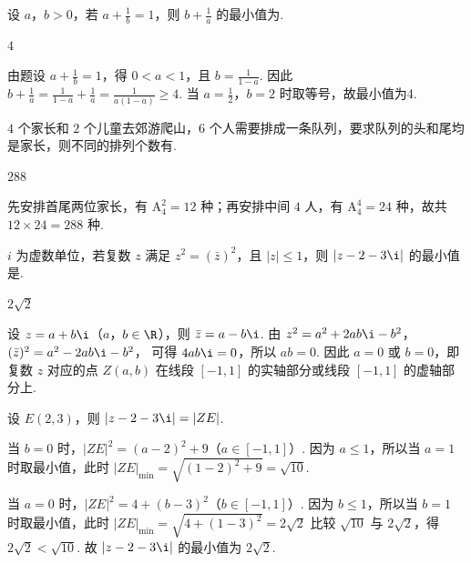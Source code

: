 \begin{problem}
设 \(a\)，\(b>0\)，若 \(a+\frac1b=1\)，则 \(b+\frac1a\) 的最小值为\fillinblank{}.
\end{problem}

\begin{answer}
\(4\)
\end{answer}

\begin{solution}
由题设 \(a+\frac1b=1\)，得 \(0<a<1\)，且 \(b=\frac1{1-a}\). 因此
\(b+\frac1a=\frac1{1-a}+\frac1a=\frac1{a(1-a)}\ge4\).
当 \(a=\frac12\)，\(b=2\) 时取等号，故最小值为4.
\end{solution}

\begin{problem}
\(4\) 个家长和 \(2\) 个儿童去郊游爬山，\(6\) 个人需要排成一条队列，要求队列的头和尾均是家长，则不同的排列个数有\fillinblank{}.
\end{problem}

\begin{answer}
\(288\)
\end{answer}

\begin{solution}
先安排首尾两位家长，有 \(\mathrm A_4^2=12\) 种；再安排中间 \(4\) 人，有 \(\mathrm A_4^4=24\) 种，故共 \(12\times24=288\) 种.
\end{solution}

\begin{problem}
\(i\) 为虚数单位，若复数 \(z\) 满足 \(z^2=(\bar z)^2\)，且 \(|z|\le1\)，则 \(|z-2-3\i|\) 的最小值是\fillinblank{}.
\end{problem}

\begin{answer}
\(2\sqrt2\)
\end{answer}

\begin{solution}
设 \(z=a+b\i\)（\(a\)，\(b\in\R\)），则 \(\bar z=a-b\i\). 由
\(z^2=a^2+2ab\i-b^2\)，\((\bar z)^2=a^2-2ab\i-b^2\)，
可得 \(4ab\i=0\)，所以 \(ab=0\).
因此 \(a=0\) 或 \(b=0\)，即复数 \(z\) 对应的点 \(Z(a,b)\) 在线段 \([-1,1]\) 的实轴部分或线段 \([-1,1]\) 的虚轴部分上.

设 \(E(2,3)\)，则 \(|z-2-3\i|=|ZE|\).

当 \(b=0\) 时，\(|ZE|^2=(a-2)^2+9\)（\(a\in[-1,1]\)）. 因为 \(a\le1\)，所以当 \(a=1\) 时取最小值，此时 \(|ZE|_{\min}=\sqrt{(1-2)^2+9}=\sqrt{10}\).

当 \(a=0\) 时，\(|ZE|^2=4+(b-3)^2\)（\(b\in[-1,1]\)）. 因为 \(b\le1\)，所以当 \(b=1\) 时取最小值，此时
\(
|ZE|_{\min}=\sqrt{4+(1-3)^2}=2\sqrt2
\)
比较 \(\sqrt{10}\) 与 \(2\sqrt2\)，得 \(2\sqrt2<\sqrt{10}\).
故 \(|z-2-3\i|\) 的最小值为 \(2\sqrt2\).
\end{solution}

